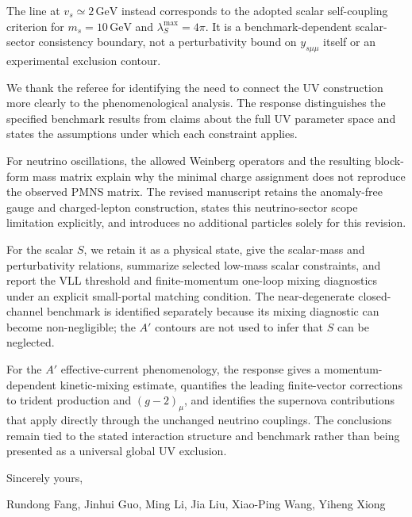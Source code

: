 \documentclass[12pt,a4paper]{article}
\begin{document}
The line at \(v_s\simeq2\,\mathrm{GeV}\) instead corresponds to the adopted scalar self-coupling criterion for \(m_s=10\,\mathrm{GeV}\) and \(\lambda_S^{\max}=4\pi\). It is a benchmark-dependent scalar-sector consistency boundary, not a perturbativity bound on \(y_{s\mu\mu}\) itself or an experimental exclusion contour. 

\medskip
{}

We thank the referee for identifying the need to connect the UV construction more clearly to the phenomenological analysis. The response distinguishes the specified benchmark results from claims about the full UV parameter space and states the assumptions under which each constraint applies.

For neutrino oscillations, the allowed Weinberg operators and the resulting block-form mass matrix explain why the minimal charge assignment does not reproduce the observed PMNS matrix. The revised manuscript retains the anomaly-free gauge and charged-lepton construction, states this neutrino-sector scope limitation explicitly, and introduces no additional particles solely for this revision.

For the scalar \(S\), we retain it as a physical state, give the scalar-mass and perturbativity relations, summarize selected low-mass scalar constraints, and report the VLL threshold and finite-momentum one-loop mixing diagnostics under an explicit small-portal matching condition. The near-degenerate closed-channel benchmark is identified separately because its mixing diagnostic can become non-negligible; the \(A'\) contours are not used to infer that \(S\) can be neglected.

For the \(A'\) effective-current phenomenology, the response gives a momentum-dependent kinetic-mixing estimate, quantifies the leading finite-vector corrections to trident production and \((g-2)_\mu\), and identifies the supernova contributions that apply directly through the unchanged neutrino couplings. The conclusions remain tied to the stated interaction structure and benchmark rather than being presented as a universal global UV exclusion.

\noindent Sincerely yours,

\noindent Rundong Fang, Jinhui Guo, Ming Li, Jia Liu, Xiao-Ping Wang, Yiheng Xiong



\end{document}
